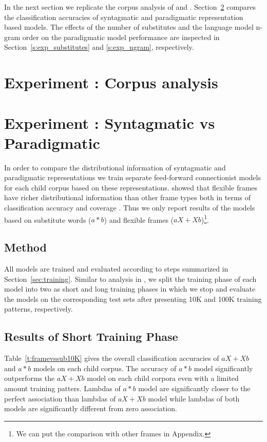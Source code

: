 In the next section we replicate the corpus analysis of \cite{Mintz200391} and
\cite{clair2010}.  Section~\ref{s:exp_paradigmatic} compares the classification
accuracies of syntagmatic and paradigmatic representation based models.  The
effects of the number of substitutes and the language model n-gram order on the
paradigmatic model performance are inspected in Section~\ref{s:exp_substitutes}
and \ref{s:exp_ngram}, respectively. 

\section{Experiment : Corpus analysis}
\label{s:exp_corpus}
\section{Experiment : Syntagmatic vs Paradigmatic}
\label{s:exp_paradigmatic}

In order to compare the distributional information of syntagmatic and
paradigmatic representations we train separate feed-forward connectionist
models for each child corpus based on these representations.  \cite{clair2010}
showed that flexible frames have richer distributional information than other
frame types both in terms of classification accuracy and coverage .  Thus we
only report results of the models based on substitute words ($a*b$) and
flexible frames ($aX+Xb$)\footnote{We can put the comparison with other frames
in Appendix.  }. 

\subsection{Method} 

All models are trained and evaluated according to steps summarized in
Section~\ref{sec:training}.  Similar to analysis in \cite{clair2010}, we split
the training phase of each model into two as short and long training phases in
which we stop and evaluate the models on the corresponding test sets after
presenting 10K and 100K training patterns, respectively.

\subsection{Results of Short Training Phase}
Table~\ref{t:framevssub10K} gives the overall classification accuracies of
$aX+Xb$ and $a*b$ models on each child corpus.  The accuracy of $a*b$ model
significantly outperforms the $aX+Xb$ model on each child corpora even with a
limited amount training patters.  Lambdas of $a*b$ model are significantly
closer to the perfect association than lambdas of $aX+Xb$ model while lambdas
of both models are significantly different from zero association.


